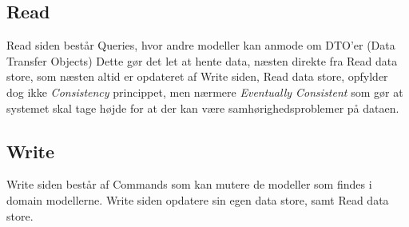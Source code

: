 \subsection{Read}

Read siden består Queries, hvor andre modeller kan anmode om DTO'er (Data Transfer Objects) Dette gør det let at hente data, næsten direkte fra Read data store, som næsten altid er opdateret af Write siden, Read data store, opfylder dog ikke \textit{Consistency} princippet, men nærmere \textit{Eventually Consistent} som gør at systemet skal tage højde for at der kan være samhørighedsproblemer på dataen. 
\subsection{Write}

Write siden består af Commands som kan mutere de modeller som findes i domain modellerne. Write siden opdatere sin egen data store, samt Read data store.

